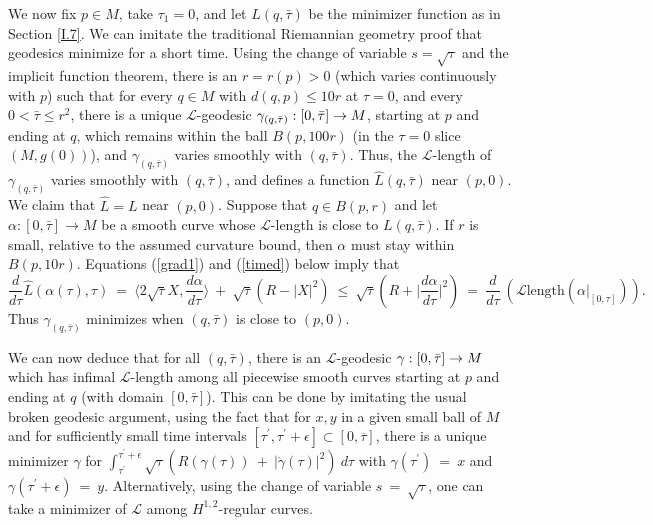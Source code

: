 We now fix $p\in M$, take $\tau_1=0$, and let $L(q,\bar\tau)$ be the
minimizer function as in Section \ref{I.7}.
We can imitate the traditional Riemannian geometry proof that geodesics
minimize for a short time.
Using the change of variable $s = \sqrt{\tau}$
and the implicit function theorem,
there is an $r=r(p)>0$ (which varies continuously with $p$) such that
for every $q\in M$ with $d(q,p)\leq 10r$ at $\tau=0$, and every
$0<\bar\tau\leq r^2$,
there is a unique ${\mathcal L}$-geodesic
$\gamma_{(q,\bar\tau)}:[0,\bar\tau]\rightarrow M$,
starting at $p$ and ending at $q$, which remains within the ball $B(p,100r)$
(in the $\tau=0$ slice $(M,g(0))$),
and $\gamma_{(q,\bar\tau)}$ varies smoothly with $(q,\bar\tau)$.
Thus, the ${\mathcal L}$-length of $\gamma_{(q,\bar\tau)}$ varies smoothly
with $(q,\bar\tau)$, and defines a function $\hat L(q,\bar\tau)$ near $(p,0)$.
We claim that $\hat L = L$ near $(p, 0)$.
Suppose that $q \in B(p,r)$ and let $\alpha : [0, \bar \tau]
\rightarrow M$ be a smooth curve whose ${\mathcal L}$-length is
close to $L(q,\bar\tau)$. If $r$ is small, relative to the
assumed curvature bound, then $\alpha$ must stay within
$B(p, 10r)$. Equations
(\ref{grad1}) and (\ref{timed}) below imply that
\begin{equation}
\frac{d}{d\tau} \hat{L}(\alpha(\tau), \tau) \: = \:
\langle 2 \sqrt{\tau} X, \frac{d\alpha}{d\tau} \rangle \: + \:
\sqrt{\tau} (R - |X|^2) \: \le \:
\sqrt{\tau} \left( R + \Big| \frac{d\alpha}{d\tau} \Big|^2 \right) \: = \:
\frac{d}{d\tau} \: \left(
{\mathcal L} \text{length}(\alpha \big|_{[0, \tau]}) \right).
\end{equation}
Thus
$\gamma_{(q, \bar \tau)}$ minimizes when $(q, \bar \tau)$ is close to
$(p, 0)$.


We can now deduce that for all $(q,\bar\tau)$, there is an
${\mathcal L}$-geodesic
$\gamma:[0,\bar\tau]\rightarrow M$ which has infimal ${\mathcal L}$-length
among all piecewise smooth curves starting at $p$ and ending at $q$
(with domain $[0,\bar\tau]$).  This can be done by  imitating the
usual broken geodesic argument, using the fact that
for $x,y$ in a given small ball of $M$ and
for sufficiently
small time intervals $[\tau^\prime, \tau^\prime+\epsilon] \subset
[0, \overline{\tau}]$, there is a unique
minimizer $\gamma$ for $\int_{\tau^\prime}^{\tau^\prime+\epsilon}
\sqrt{\tau} \left( R(\gamma(\tau)) \: +\: \left| \dot{\gamma}(\tau)
\right|^2 \right) \: d\tau$ with
$\gamma(\tau^\prime) \: = \: x$ and
$\gamma(\tau^\prime+\epsilon) \: = \: y$. Alternatively, using the
change of variable $s \: = \: \sqrt{\tau}$, one can
take a minimizer of ${\mathcal L}$ among $H^{1,2}$-regular curves.

